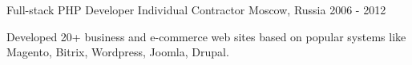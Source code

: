 \begin{cventries}
  \cventry
    {Full-stack PHP Developer} %
    {Individual Contractor} %
    {Moscow, Russia} %
    {2006 - 2012} %
    {
      \begin{cvitems} %
        \item {Developed 20+ business and e-commerce web sites based on popular systems like Magento, Bitrix, Wordpress, Joomla, Drupal.}
      \end{cvitems}
    }

\end{cventries}
